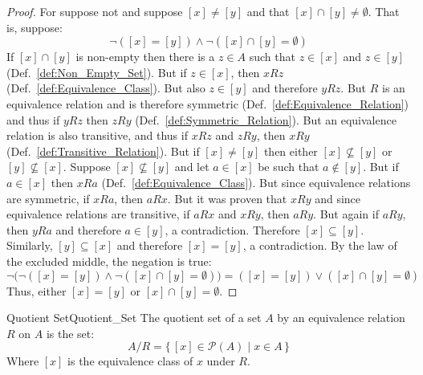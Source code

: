     \begin{proof}
        For suppose not and suppose $[x]\ne[y]$ and that
        $[x]\cap[y]\ne\emptyset$. That is, suppose:
        \begin{equation*}
            \neg([x]=[y])\land\neg([x]\cap[y]=\emptyset)
        \end{equation*}
        If $[x]\cap[y]$ is non-empty then there is a
        $z\in{A}$ such that $z\in[x]$ and $z\in[y]$
        (Def.~\ref{def:Non_Empty_Set}). But if $z\in[x]$, then $xRz$
        (Def.~\ref{def:Equivalence_Class}). But also
        $z\in[y]$ and therefore $yRz$. But $R$ is an equivalence relation and
        is therefore symmetric (Def.~\ref{def:Equivalence_Relation}) and thus
        if $yRz$ then $zRy$ (Def.~\ref{def:Symmetric_Relation}). But an
        equivalence relation is also transitive, and thus if $xRz$ and $zRy$,
        then $xRy$ (Def.~\ref{def:Transitive_Relation}). But if $[x]\ne[y]$ then
        either $[x]\nsubseteq[y]$ or $[y]\nsubseteq[x]$. Suppose
        $[x]\nsubseteq[y]$ and let $a\in[x]$ be such that $a\notin[y]$. But
        if $a\in[x]$ then $xRa$ (Def.~\ref{def:Equivalence_Class}). But since
        equivalence relations are symmetric, if $xRa$, then $aRx$. But it was
        proven that $xRy$ and since equivalence relations are transitive, if
        $aRx$ and $xRy$, then $aRy$. But again if $aRy$, then $yRa$ and
        therefore $a\in[y]$, a contradiction. Therefore $[x]\subseteq[y]$.
        Similarly, $[y]\subseteq[x]$ and therefore $[x]=[y]$, a contradiction.
        By the law of the excluded middle, the negation is true:
        \begin{equation*}
            \neg\big(\neg([x]=[y])\land\neg([x]\cap[y]=\emptyset)\big)
            =([x]=[y])\lor([x]\cap[y]=\emptyset)
        \end{equation*}
        Thus, either $[x]=[y]$ or $[x]\cap[y]=\emptyset$.
    \end{proof}
    \begin{fdefinition}{Quotient Set}{Quotient_Set}
        The quotient set of a set $A$ by an equivalence relation $R$ on $A$ is
        the set:
        \begin{equation*}
            A/R=\{\,[x]\in\mathcal{P}(A)\;|\;x\in{A}\,\}
        \end{equation*}
        Where $[x]$ is the equivalence class of $x$ under $R$.
    \end{fdefinition}
